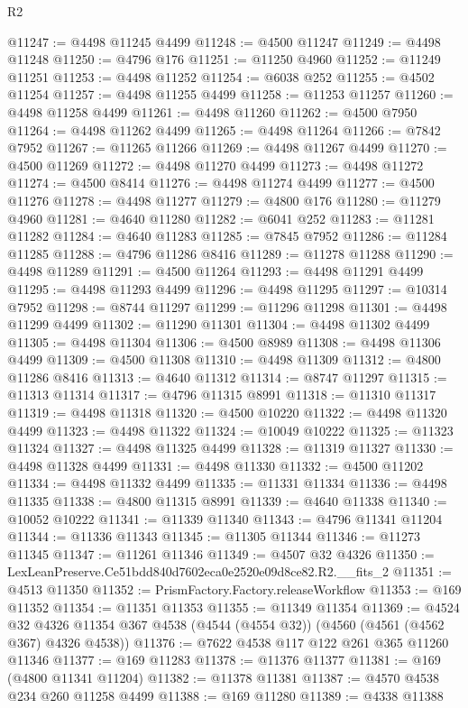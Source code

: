 \begin{lexlean}{R2}
\begin{coremodule}
@11247 := @4498 @11245 @4499
@11248 := @4500 @11247
@11249 := @4498 @11248
@11250 := @4796 @176
@11251 := @11250 @4960
@11252 := @11249 @11251
@11253 := @4498 @11252
@11254 := @6038 @252
@11255 := @4502 @11254
@11257 := @4498 @11255 @4499
@11258 := @11253 @11257
@11260 := @4498 @11258 @4499
@11261 := @4498 @11260
@11262 := @4500 @7950
@11264 := @4498 @11262 @4499
@11265 := @4498 @11264
@11266 := @7842 @7952
@11267 := @11265 @11266
@11269 := @4498 @11267 @4499
@11270 := @4500 @11269
@11272 := @4498 @11270 @4499
@11273 := @4498 @11272
@11274 := @4500 @8414
@11276 := @4498 @11274 @4499
@11277 := @4500 @11276
@11278 := @4498 @11277
@11279 := @4800 @176
@11280 := @11279 @4960
@11281 := @4640 @11280
@11282 := @6041 @252
@11283 := @11281 @11282
@11284 := @4640 @11283
@11285 := @7845 @7952
@11286 := @11284 @11285
@11288 := @4796 @11286 @8416
@11289 := @11278 @11288
@11290 := @4498 @11289
@11291 := @4500 @11264
@11293 := @4498 @11291 @4499
@11295 := @4498 @11293 @4499
@11296 := @4498 @11295
@11297 := @10314 @7952
@11298 := @8744 @11297
@11299 := @11296 @11298
@11301 := @4498 @11299 @4499
@11302 := @11290 @11301
@11304 := @4498 @11302 @4499
@11305 := @4498 @11304
@11306 := @4500 @8989
@11308 := @4498 @11306 @4499
@11309 := @4500 @11308
@11310 := @4498 @11309
@11312 := @4800 @11286 @8416
@11313 := @4640 @11312
@11314 := @8747 @11297
@11315 := @11313 @11314
@11317 := @4796 @11315 @8991
@11318 := @11310 @11317
@11319 := @4498 @11318
@11320 := @4500 @10220
@11322 := @4498 @11320 @4499
@11323 := @4498 @11322
@11324 := @10049 @10222
@11325 := @11323 @11324
@11327 := @4498 @11325 @4499
@11328 := @11319 @11327
@11330 := @4498 @11328 @4499
@11331 := @4498 @11330
@11332 := @4500 @11202
@11334 := @4498 @11332 @4499
@11335 := @11331 @11334
@11336 := @4498 @11335
@11338 := @4800 @11315 @8991
@11339 := @4640 @11338
@11340 := @10052 @10222
@11341 := @11339 @11340
@11343 := @4796 @11341 @11204
@11344 := @11336 @11343
@11345 := @11305 @11344
@11346 := @11273 @11345
@11347 := @11261 @11346
@11349 := @4507 @32 @4326
@11350 := LexLeanPreserve.Ce51bdd840d7602eca0e2520e09d8ce82.R2.__fits_2
@11351 := @4513 @11350
@11352 := PrismFactory.Factory.releaseWorkflow
@11353 := @169 @11352
@11354 := @11351 @11353
@11355 := @11349 @11354
@11369 := @4524
    @32
    @4326
    @11354
    @367
    @4538
    (@4544 (@4554 @32))
    (@4560 (@4561 (@4562 @367) @4326 @4538))
@11376 := @7622 @4538 @117 @122 @261 @365 @11260 @11346
@11377 := @169 @11283
@11378 := @11376 @11377
@11381 := @169 (@4800 @11341 @11204)
@11382 := @11378 @11381
@11387 := @4570 @4538 @234 @260 @11258 @4499
@11388 := @169 @11280
@11389 := @4338 @11388

\end{coremodule}
\end{lexlean}
